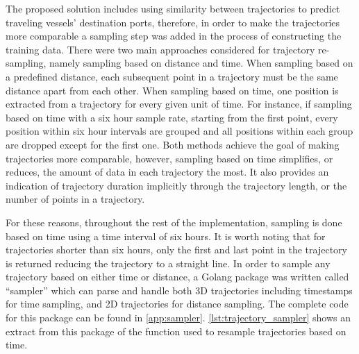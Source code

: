The proposed solution includes using similarity between trajectories to predict traveling vessels' destination ports, therefore, in order to make the trajectories more comparable a sampling step was added in the process of constructing the training data. There were two main approaches considered for trajectory re-sampling, namely sampling based on distance and time. When sampling based on a predefined distance, each subsequent point in a trajectory must be the same distance apart from each other. When sampling based on time, one position is extracted from a trajectory for every given unit of time. For instance, if sampling based on time with a six hour sample rate, starting from the first point, every position within six hour intervals are grouped and all positions within each group are dropped except for the first one. Both methods achieve the goal of making trajectories more comparable, however, sampling based on time simplifies, or reduces, the amount of data in each trajectory the most. It also provides an indication of trajectory duration implicitly through the trajectory length, or the number of points in a trajectory.

For these reasons, throughout the rest of the implementation, sampling is done based on time using a time interval of six hours. It is worth noting that for trajectories shorter than six hours, only the first and last point in the trajectory is returned reducing the trajectory to a straight line. In order to sample any trajectory based on either time or distance, a Golang package was written called ``sampler'' which can parse and handle both 3D trajectories including timestamps for time sampling, and 2D trajectories for distance sampling. The complete code for this package can be found in \cref{app:sampler}. \cref{lst:trajectory_sampler} shows an extract from this package of the function used to resample trajectories based on time.

